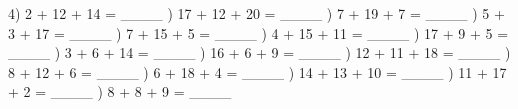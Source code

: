 \documentclass{article}%
\begin{document}
4) 2 + 12 + 14 = \_\_\_\_%
\newline%
\newline%
) 17 + 12 + 20 = \_\_\_\_%
\newline%
\newline%
) 7 + 19 + 7 = \_\_\_\_%
\newline%
\newline%
) 5 + 3 + 17 = \_\_\_\_%
\newline%
\newline%
) 7 + 15 + 5 = \_\_\_\_%
\newline%
\newline%
) 4 + 15 + 11 = \_\_\_\_%
\newline%
\newline%
) 17 + 9 + 5 = \_\_\_\_%
\newline%
\newline%
) 3 + 6 + 14 = \_\_\_\_%
\newline%
\newline%
) 16 + 6 + 9 = \_\_\_\_%
\newline%
\newline%
) 12 + 11 + 18 = \_\_\_\_%
\newline%
\newline%
) 8 + 12 + 6 = \_\_\_\_%
\newline%
\newline%
) 6 + 18 + 4 = \_\_\_\_%
\newline%
\newline%
) 14 + 13 + 10 = \_\_\_\_%
\newline%
\newline%
) 11 + 17 + 2 = \_\_\_\_%
\newline%
\newline%
) 8 + 8 + 9 = \_\_\_\_%
\newline%
\newline%
\end{document}
